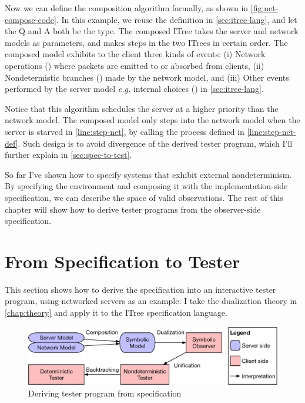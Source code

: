 Now we can define the composition algorithm formally, as shown in
\autoref{fig:net-compose-code}.  In this example, we reuse the 
definition in \autoref{sec:itree-lang}, and let the \ilc Q and \ilc A both be
the  type.  The composed ITree takes the server and network models
as parameters, and makes steps in the two ITrees in certain order.  The composed
model exhibits to the client three kinds of events: (i) Network operations
() where packets are emitted to or absorbed from clients, (ii)
Nondetermistic branches () made by the network model, and (iii)
Other events  performed by the server model {\it e.g.} internal
choices () in \autoref{sec:itree-lang}.

Notice that this algorithm schedules the server at a higher priority than the
network model.  The composed model only steps into the network model when the
server is starved in \autoref{line:step-net}, by calling the 
process defined in \autoref{line:step-net-def}.  Such design is to avoid
divergence of the derived tester program, which I'll further explain in
\autoref{sec:spec-to-test}.

So far I've shown how to specify systems that exhibit external nondeterminism.
By specifying the environment and composing it with the implementation-side
specification, we can describe the space of valid observations.  The rest of
this chapter will show how to derive tester programs from the observer-side
specification.

\section{From Specification to Tester}
\label{sec:spec-to-test}

This section shows how to derive the specification into an interactive tester
program, using networked servers as an example.  I take the dualization theory
in \autoref{chap:theory} and apply it to the ITree specification language.

\begin{figure}
  \includegraphics[width=\linewidth]{figures/framework}
  \caption{Deriving tester program from specification}
  \label{fig:framework}
\end{figure}

